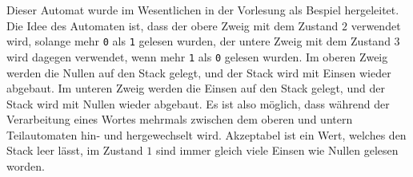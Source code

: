 \begin{hinweis}
Dieser Automat wurde im Wesentlichen in der Vorlesung als Bespiel
hergeleitet. Die Idee des Automaten ist, dass der obere Zweig mit
dem Zustand $2$ verwendet wird, solange mehr \texttt{0} als \texttt{1}
gelesen wurden, der untere Zweig mit dem Zustand $3$ wird
dagegen verwendet, wenn mehr \texttt{1} als \texttt{0} gelesen wurden.
Im oberen Zweig werden die Nullen auf den Stack gelegt, und der Stack wird
mit Einsen wieder abgebaut.
Im unteren Zweig werden die Einsen auf den Stack gelegt, und der Stack
wird mit Nullen wieder abgebaut.
Es ist also möglich, dass während der Verarbeitung eines Wortes
mehrmals zwischen dem oberen und untern Teilautomaten hin- und hergewechselt
wird.
Akzeptabel ist ein Wert, welches den Stack leer lässt, im Zustand $1$
sind immer gleich viele Einsen wie Nullen gelesen worden.
\end{hinweis}


